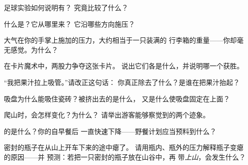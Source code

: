 \begin{exercise}[$\star$]\label{exo:g5:air-pressure-weather:1}
足球实验如何说明有？
究竟比较了什么？
\end{exercise}

\begin{exercise}[$\star$]\label{exo:g5:air-pressure-weather:2}
什么是？它从哪里来？
它沿哪些方向施压？
\end{exercise}

\begin{exercise}[$\star$]\label{exo:g5:air-pressure-weather:3}
大气在你的手掌上施加的压力，大约相当于一只装满的
行李箱的重量——你却毫无感觉。为什么？
\end{exercise}

\begin{exercise}[$\star$]\label{exo:g5:air-pressure-weather:4}
在卡片魔术中，两股力争夺这张卡片。
说出它们各是什么，并说明哪一个获胜。
\end{exercise}

\begin{exercise}[$\star$]\label{exo:g5:air-pressure-weather:5}
“我把果汁拉上吸管。”请改正这句话：
你真正除去了什么？是谁在把果汁抬起？
\end{exercise}

\begin{exercise}[$\star$]\label{exo:g5:air-pressure-weather:6}
吸盘为什么能吸住瓷砖？被挤出去的是什么，
又是什么使吸盘固定在上面？
\end{exercise}

\begin{exercise}[$\star$]\label{exo:g5:air-pressure-weather:7}
爬山时，会怎样变化？为什么？
请举出游客能够察觉到的两个迹象。
\end{exercise}

\begin{exercise}[$\star$]\label{exo:g5:air-pressure-weather:8}
的是什么？你的自早餐后
一直快速下降——野餐计划应当预料到什么？
\end{exercise}

\begin{exercise}[$\star\star$]\label{exo:g5:air-pressure-weather:9}
密封的瓶子在从山上开车下来的途中瘪了。
请用瓶内、瓶外的压力解释瓶子变瘪的原因——并
预测：若把一只密封的瓶子放在山谷中，再
带\emph{上山}，会发生什么？
\end{exercise}

